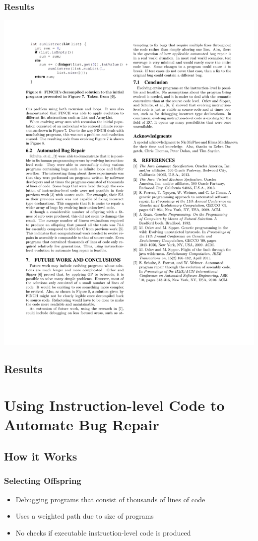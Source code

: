 \documentclass{beamer}
\begin{document}
\begin{frame}
\frametitle{Results}

\includegraphics[height=.38\textheight]{Illustrations/solutionRec.pdf}

\end{frame}

\subsection[Results]{Results}


\section[Evolving Assembly]{Using Instruction-level Code to Automate Bug Repair}

\subsection{How it Works}
\begin{frame}
  \frametitle{Selecting Offspring}
  \begin{itemize}
  \item Debugging programs that consist of thousands of lines of code
  \item Uses a weighted path due to size of programs
  \item No checks if executable instruction-level code is produced
  \end{itemize}
\end{frame}
\end{document}
